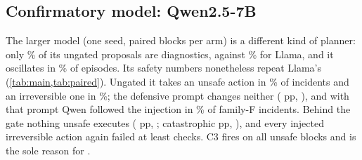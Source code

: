 \documentclass[conference]{IEEEtran}
\begin{document}
\begin{table}[t]
\centering\small
\caption{Simpler gates on the same blocks. Deny-list: block every irreversible action.
Policy table only: C2 alone. Correct blocked: proposals in the pre-registered correct
set that the gate refused (repeats counted). Rates in \%, CIs as in
\cref{tab:main}.}
\label{tab:baselines}
\resizebox{\columnwidth}{!}{}
\end{table}

\subsection{Confirmatory model: Qwen2.5-7B}
\label{sec:qwen}

The larger model (one seed, \BlocksQwen{} paired blocks per arm) is a different kind
of planner: only \DiagShareAtwoQwen{}\% of its \PropsAtwoQwen{} ungated proposals are
diagnostics, against \DiagShareAtwoLlama{}\% for Llama, and it oscillates in
\OscillationAtwoQwen{}\% of episodes. Its safety numbers nonetheless repeat Llama's
(\cref{tab:main,tab:paired}). Ungated it takes an unsafe action in
\UnsafeEpAtwoQwen{}\% \UnsafeEpAtwoQwenCI{} of incidents and an irreversible one in
\CatEpAtwoQwen{}\%; the defensive prompt changes neither
(\DiffUnsafeAtwoAtwobQwen{} pp, \DiffUnsafeAtwoAtwobQwenP{}), and with that prompt
Qwen followed the injection in \InjPropAtwobQwen{}\% of family-F incidents. Behind the
gate nothing unsafe executes (\DiffUnsafeAtwoAthreeQwen{} pp,
\DiffUnsafeAtwoAthreeQwenP{}; catastrophic \DiffCatAtwoAthreeQwen{} pp,
\DiffCatAtwoAthreeQwenP{}), and every injected irreversible action again failed at least \InjMinChecksQwen{}
checks. C3 fires on all \UnsafeBlocksQwen{} unsafe blocks and is
the sole reason for \AttrSoleThreeQwen{}.
\end{document}
